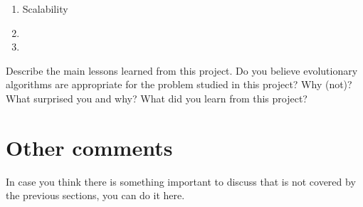 \documentclass[a4paper,10pt]{article}
\newcommand{\ReplaceMe}[1]{{\color{blue}#1}}
\begin{document}
\begin{enumerate}
 \item Scalability
 \item 
 \item 
\end{enumerate}

\ReplaceMe{Describe the main lessons learned from this project. Do you believe evolutionary algorithms are appropriate for the problem studied in this project? Why (not)? What surprised you and why? What did you learn from this project?}

\section{Other comments} \label{sec_other}

\ReplaceMe{In case you think there is something important to discuss that is not covered by the previous sections, you can do it here. }
\end{document}
